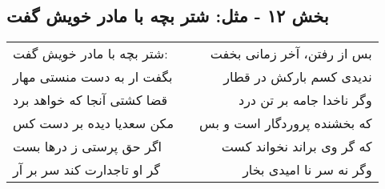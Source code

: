 \begin{center}
\section*{بخش ۱۲ - مثل: شتر بچه با مادر خویش گفت}
\label{sec:012}
\begin{longtable}{l p{0.5cm} r}
شتر بچه با مادر خویش گفت:
&&
بس از رفتن، آخر زمانی بخفت
\\
بگفت ار به دست منستی مهار
&&
ندیدی کسم بارکش در قطار
\\
قضا کشتی آنجا که خواهد برد
&&
وگر ناخدا جامه بر تن درد
\\
مکن سعدیا دیده بر دست کس
&&
که بخشنده پروردگار است و بس
\\
اگر حق پرستی ز درها بست
&&
که گر وی براند نخواند کست
\\
گر او تاجدارت کند سر بر آر
&&
وگر نه سر نا امیدی بخار
\\
\end{longtable}
\end{center}
